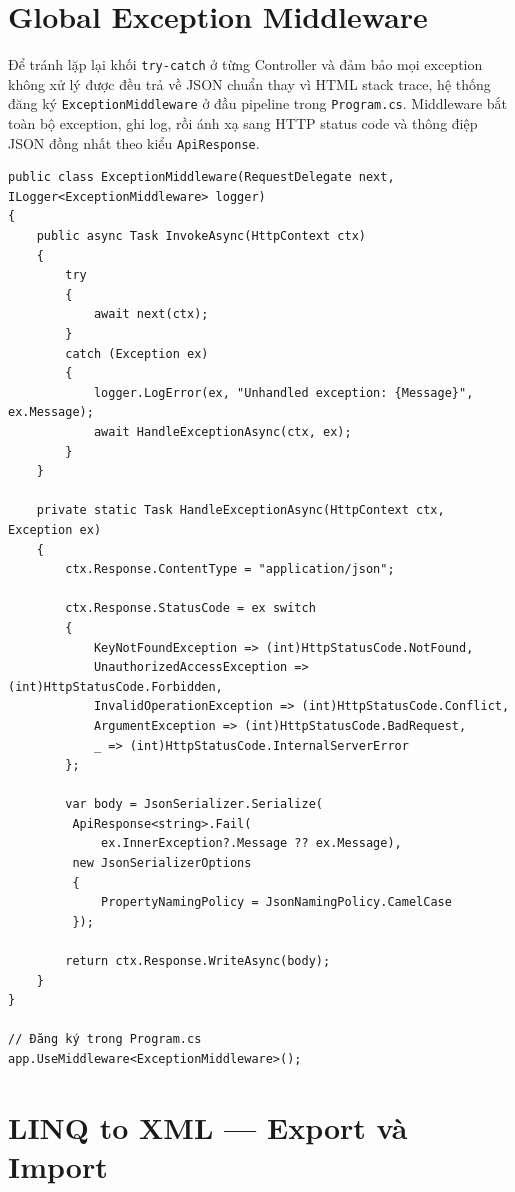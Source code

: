 \section{Global Exception Middleware}\label{Sec4.3}

Để tránh lặp lại khối \texttt{try-catch} ở từng Controller và đảm bảo
mọi exception không xử lý được đều trả về JSON chuẩn thay vì HTML stack trace,
hệ thống đăng ký \texttt{ExceptionMiddleware} ở đầu pipeline trong \texttt{Program.cs}.
Middleware bắt toàn bộ exception, ghi log, rồi ánh xạ sang HTTP status code
và thông điệp JSON đồng nhất theo kiểu \texttt{ApiResponse}.

\begin{lstlisting}[style=csharp, caption={ExceptionMiddleware xử lý lỗi tập trung}]
public class ExceptionMiddleware(RequestDelegate next, ILogger<ExceptionMiddleware> logger)
{
    public async Task InvokeAsync(HttpContext ctx)
    {
        try
        {
            await next(ctx);
        }
        catch (Exception ex)
        {
            logger.LogError(ex, "Unhandled exception: {Message}", ex.Message);
            await HandleExceptionAsync(ctx, ex);
        }
    }

    private static Task HandleExceptionAsync(HttpContext ctx, Exception ex)
    {
        ctx.Response.ContentType = "application/json";

        ctx.Response.StatusCode = ex switch
        {
            KeyNotFoundException => (int)HttpStatusCode.NotFound,
            UnauthorizedAccessException => (int)HttpStatusCode.Forbidden,
            InvalidOperationException => (int)HttpStatusCode.Conflict,
            ArgumentException => (int)HttpStatusCode.BadRequest,
            _ => (int)HttpStatusCode.InternalServerError
        };

        var body = JsonSerializer.Serialize(
         ApiResponse<string>.Fail(
             ex.InnerException?.Message ?? ex.Message),
         new JsonSerializerOptions
         {
             PropertyNamingPolicy = JsonNamingPolicy.CamelCase
         });

        return ctx.Response.WriteAsync(body);
    }
}

// Đăng ký trong Program.cs 
app.UseMiddleware<ExceptionMiddleware>();
\end{lstlisting}
\section{LINQ to XML --- Export và Import}\label{Sec4.4}

